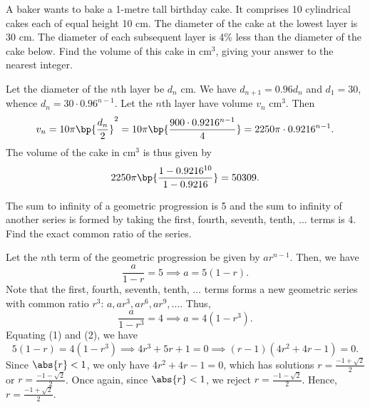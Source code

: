 \begin{problem}
    A baker wants to bake a 1-metre tall birthday cake. It comprises 10 cylindrical cakes each of equal height 10 cm. The diameter of the cake at the lowest layer is 30 cm. The diameter of each subsequent layer is 4\% less than the diameter of the cake below. Find the volume of this cake in cm$^3$, giving your answer to the nearest integer.
\end{problem}
\begin{solution}
    Let the diameter of the $n$th layer be $d_n$ cm. We have $d_{n+1} = 0.96d_n$ and $d_1 = 30$, whence $d_n = 30\cdot0.96^{n-1}$. Let the $n$th layer have volume $v_n$ cm$^3$. Then \[v_n = 10 \pi \bp{\frac{d_n}{2}}^2 = 10\pi \bp{\frac{900 \cdot 0.9216^{n-1}}{4}} = 2250\pi \cdot 0.9216^{n-1}.\] The volume of the cake in cm$^3$ is thus given by \[2250\pi \bp{\frac{1 - 0.9216^{10}}{1 - 0.9216}} = 50309.\]
\end{solution}

\begin{problem}
    The sum to infinity of a geometric progression is 5 and the sum to infinity of another series is formed by taking the first, fourth, seventh, tenth, $\ldots$ terms is 4. Find the exact common ratio of the series.
\end{problem}
\begin{solution}
    Let the $n$th term of the geometric progression be given by $ar^{n-1}$. Then, we have \[\frac{a}{1 - r} = 5 \implies a = 5(1-r). \tag{1}\] Note that the first, fourth, seventh, tenth, $\ldots$ terms forms a new geometric series with common ratio $r^3$: $a, ar^3, ar^6, ar^9, \ldots$. Thus, \[\frac{a}{1 - r^3} = 4 \implies a = 4(1 - r^3). \tag{2}\] Equating (1) and (2), we have \[5(1-r) = 4(1 - r^3) \implies 4r^3 + 5r + 1 = 0 \implies (r - 1)(4r^2 + 4r - 1) = 0.\] Since $\abs{r} < 1$, we only have $4r^2 + 4r - 1 = 0$, which has solutions $r = \frac{-1+\sqrt2}2$ or $r = \frac{-1-\sqrt2}{2}$. Once again, since $\abs{r} < 1$, we reject $r = \frac{-1-\sqrt2}{2}$. Hence, $r = \frac{-1+\sqrt2}{2}$.
\end{solution}

